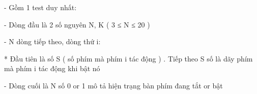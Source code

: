 - Gồm 1 test duy nhất:  

   - Dòng đầu là 2 số nguyên N, K ( 3 ≤ N ≤ 20 )  

   - N dòng tiếp theo, dòng thứ i:  

   * Đầu tiên là số S ( số phím mà phím i tác động ) . Tiếp theo S số là dãy phím mà phím i tác động khi bật nó  

   - Dòng cuối là N số 0 or 1 mô tả hiện trạng bàn phím đang tắt or bật
